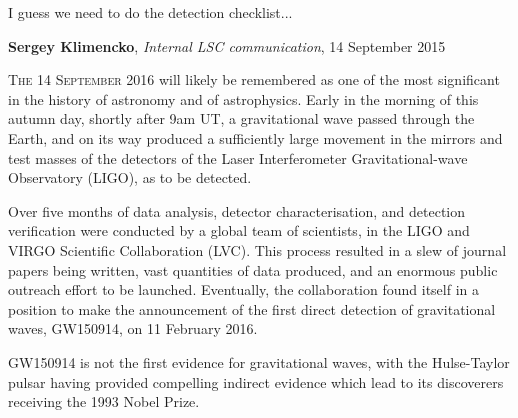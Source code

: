 
\epigraph{I guess we need to do the detection checklist...}{\textbf{Sergey Klimencko}, \emph{Internal LSC communication}, 14 September 2015}

\lettrine[lines=3]{T}{he 14 September 2016} will likely be remembered as one of the most
significant in the history of astronomy and of astrophysics. Early in
the morning of this autumn day, shortly after 9am UT, a gravitational
wave passed through the Earth, and on its way produced a sufficiently
large movement in the mirrors and test masses of the detectors of the
Laser Interferometer Gravitational-wave Observatory (\gls{LIGO}), as to be
detected.

Over five months of data analysis, detector characterisation, and
detection verification were conducted by a global team of scientists,
in the LIGO and VIRGO Scientific Collaboration (LVC). This process
resulted in a slew of journal papers being written, vast quantities of
data produced, and an enormous public outreach effort to be
launched. Eventually, the collaboration found itself in a position to
make the announcement of the first direct detection of gravitational
waves, GW150914, on 11 February 2016.

GW150914 is not the first evidence for gravitational waves, with the
Hulse-Taylor pulsar\cite{1975ApJ...195L..51H,2005ASPC..328...25W}
having provided compelling indirect evidence which lead to its
discoverers receiving the 1993 Nobel Prize.

